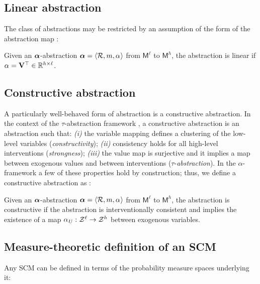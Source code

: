 \subsection{Linear abstraction}
The class of abstractions may be restricted by an assumption of the form of the abstraction map :

\begin{definition}\label{def:lca}
Given an $\boldsymbol{\alpha}$-abstraction $\boldsymbol{\alpha} = \langle \mathcal{R}, m, \alpha_{} \rangle$ from $\mathsf{M}^\ell$ to $\mathsf{M}^h$, the abstraction is linear if $\alpha_{} = \mathbf{V}^\top \in \mathbb{R}^{h \times \ell}$.
\end{definition}

\subsection{Constructive abstraction}
A particularly well-behaved form of abstraction is a constructive abstraction. In the context of the $\tau$-abstraction framework , a constructive abstraction is an abstraction such that: \emph{(i)} the variable mapping defines a clustering of the low-level variables (\emph{constructivity}); \emph{(ii)} consistency holds for all high-level interventions (\emph{strongness}); \emph{(iii)} the value map is surjective and it implies a map between exogenous values and between interventions ($\tau$-\emph{abstraction}). In the $\alpha$-framework a few of these properties hold by construction; thus, we define a constructive abstraction as : 

\begin{definition}\label{def:cca}
Given an $\boldsymbol{\alpha}$-abstraction $\boldsymbol{\alpha} = \langle \mathcal{R}, m, \alpha_{} \rangle$ from $\mathsf{M}^\ell$ to $\mathsf{M}^h$, the abstraction is constructive if the abstraction is interventionally consistent and implies the existence of a map ${\alpha_{}}_U: \mathcal{Z}^\ell \rightarrow \mathcal{Z}^h$ between exogenous variables.
\end{definition}

\subsection{Measure-theoretic definition of an SCM}\label{subsec:SCM_prob}

Any SCM can be defined in terms of the probability measure spaces underlying it:

